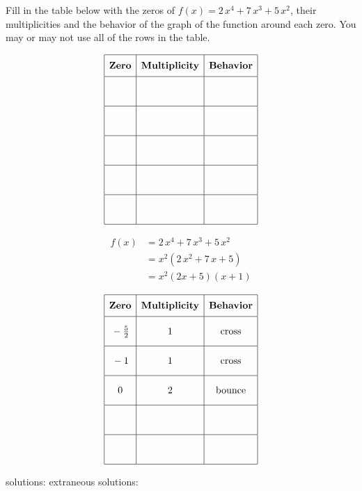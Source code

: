 \question[6] 
Fill in the table below with the zeros of \(f(x) = 2 \, x^{4} + 7 \, x^{3} + 5 \, x^{2}\), their multiplicities and the behavior of the graph of the function around each zero. You may or may not use all of the rows in the table.

 \[\begin{array}{|c|c|c|} \hline \rule[-0.8em]{0pt}{2.2em} \textbf{Zero} & \textbf{Multiplicity} & \textbf{Behavior} \\ \hline \rule[-1.2em]{0pt}{3em} & & \\ \hline \rule[-1.2em]{0pt}{3em} & & \\ \hline \rule[-1.2em]{0pt}{3em} & & \\ \hline \rule[-1.2em]{0pt}{3em} & & \\ \hline \rule[-1.2em]{0pt}{3em} & & \\ \hline \end{array}\] 

\begin{solution}
\[\begin{aligned} f(x) &= 2 \, x^{4} + 7 \, x^{3} + 5 \, x^{2} \\ &= x^2(2 \, x^{2} + 7 \, x + 5) \\ &= x^2(2x + 5)(x + 1) \end{aligned}\]

 \[\begin{array}{|c|c|c|} \hline \rule[-0.8em]{0pt}{2.2em} \textbf{Zero} & \textbf{Multiplicity} & \textbf{Behavior} \\ \hline \rule[-1.2em]{0pt}{3em} -\frac{5}{2} & 1 & \text{cross} \\ \hline \rule[-1.2em]{0pt}{3em} -1 & 1 & \text{cross} \\ \hline \rule[-1.2em]{0pt}{3em} 0 & 2 & \text{bounce} \\ \hline \rule[-1.2em]{0pt}{3em} & & \\ \hline \rule[-1.2em]{0pt}{3em} & & \\ \hline \end{array}\]
\end{solution}
\par solutions: \fillin\fillin {} extraneous solutions: \fillin\fillin

